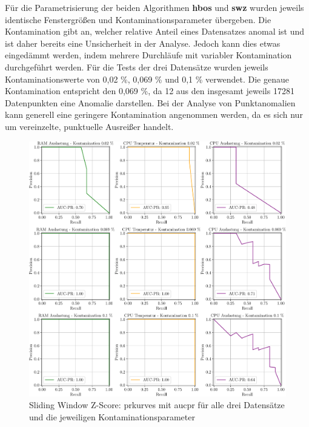 Für die Parametrisierung der beiden Algorithmen \textbf{\acf{hbos}} und \textbf{\ac{swz}} wurden
jeweils identische Fenstergrößen und Kontaminationsparameter übergeben. Die Kontamination gibt an, welcher relative Anteil eines Datensatzes
anomal ist und ist daher bereits eine Unsicherheit in der Analyse. Jedoch kann dies etwas eingedämmt werden, indem mehrere Durchläufe mit
variabler Kontamination durchgeführt werden. Für die Tests der drei Datensätze wurden jeweils Kontaminationswerte von 0,02 \%, 0,069 \% und
0,1 \% verwendet. Die genaue Kontamination entspricht den 0,069 \%, da 12 aus den insgesamt jeweils 17281 Datenpunkten eine Anomalie
darstellen. Bei der Analyse von Punktanomalien kann generell eine geringere Kontamination angenommen werden, da es sich nur um vereinzelte,
punktuelle Ausreißer handelt.

\begin{figure}[b!]
    \centering
        \includegraphics[width=1\linewidth]{ch5_anomalieerkennung/abbildungen/SWZ_AUC_PR.pdf}
    \caption{\centering Sliding Window Z-Score: \acp{prkurve} mit \acs*{aucpr} für alle drei Datensätze und die jeweiligen Kontaminationsparameter}
    \label{fig:hbos_auc_pr}
\end{figure}

